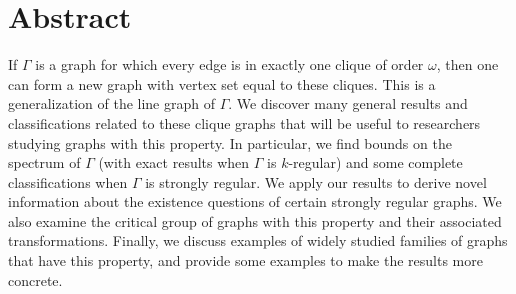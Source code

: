 \documentclass[12pt]{report}
\theoremstyle{definition}
\begin{document}
\chapter*{Abstract}
If $\Gamma$ is a graph for which every edge is in exactly one clique of order $\omega$, then one can form a new graph with vertex set equal to these cliques.  This is a generalization of the line graph of $\Gamma$.  We discover many general results and classifications related to these clique graphs that will be useful to researchers studying graphs with this property. In particular, we find bounds on the spectrum of $\Gamma$ (with exact results when $\Gamma$ is $k$-regular) and some complete classifications when $\Gamma$ is strongly regular. We apply our results to derive novel information about the existence questions of certain strongly regular graphs. We also examine the critical group of graphs with this property and their associated transformations. Finally, we discuss examples of widely studied families of graphs that have this property, and provide some examples to make the results more concrete. 
\clearpage

\end{document}
